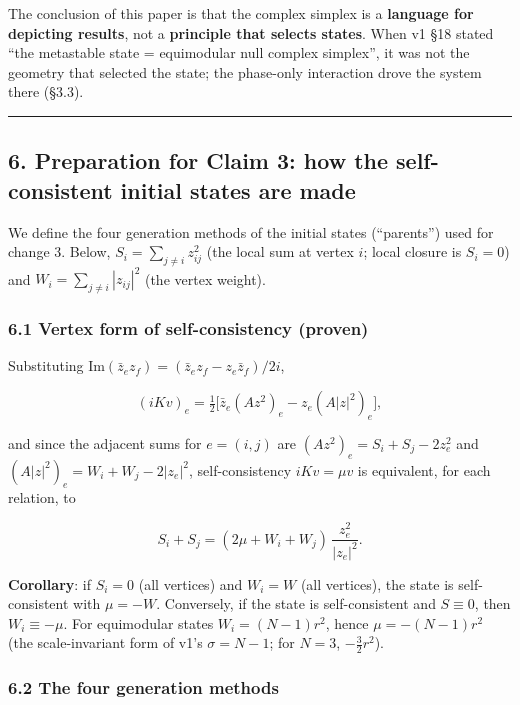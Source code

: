 \documentclass[
  10pt,
  a4paper,
]{article}
\begin{document}
The conclusion of this paper is that the complex simplex is a
\textbf{language for depicting results}, not a \textbf{principle that
selects states}. When v1 §18 stated ``the metastable state = equimodular
null complex simplex'', it was not the geometry that selected the state;
the phase-only interaction drove the system there (§3.3).

\begin{center}\rule{0.5\linewidth}{0.5pt}\end{center}

\subsection{6. Preparation for Claim 3: how the self-consistent initial
states are
made}\label{preparation-for-claim-3-how-the-self-consistent-initial-states-are-made}

We define the four generation methods of the initial states
(``parents'') used for change 3. Below, \(S_i=\sum_{j\ne i}z_{ij}^2\)
(the local sum at vertex \(i\); local closure is \(S_i=0\)) and
\(W_i=\sum_{j\ne i}|z_{ij}|^2\) (the vertex weight).

\subsubsection{6.1 Vertex form of self-consistency
(proven)}\label{vertex-form-of-self-consistency-proven}

Substituting \(\mathrm{Im}(\bar z_ez_f)=(\bar z_ez_f-z_e\bar z_f)/2i\),

\[
(iKv)_e=\tfrac12\bigl[\bar z_e(Az^2)_e-z_e(A|z|^2)_e\bigr],
\]

and since the adjacent sums for \(e=(i,j)\) are
\((Az^2)_e=S_i+S_j-2z_e^2\) and \((A|z|^2)_e=W_i+W_j-2|z_e|^2\),
self-consistency \(iKv=\mu v\) is equivalent, for each relation, to

\[
S_i+S_j=(2\mu+W_i+W_j)\,\frac{z_e^2}{|z_e|^2}.
\]

\textbf{Corollary}: if \(S_i=0\) (all vertices) and \(W_i=W\) (all
vertices), the state is self-consistent with \(\mu=-W\). Conversely, if
the state is self-consistent and \(S\equiv0\), then \(W_i\equiv-\mu\).
For equimodular states \(W_i=(N-1)r^2\), hence \(\mu=-(N-1)r^2\) (the
scale-invariant form of v1's \(\sigma=N-1\); for \(N=3\),
\(-\tfrac32 r^2\)).

\subsubsection{6.2 The four generation
methods}\label{the-four-generation-methods}
\end{document}
